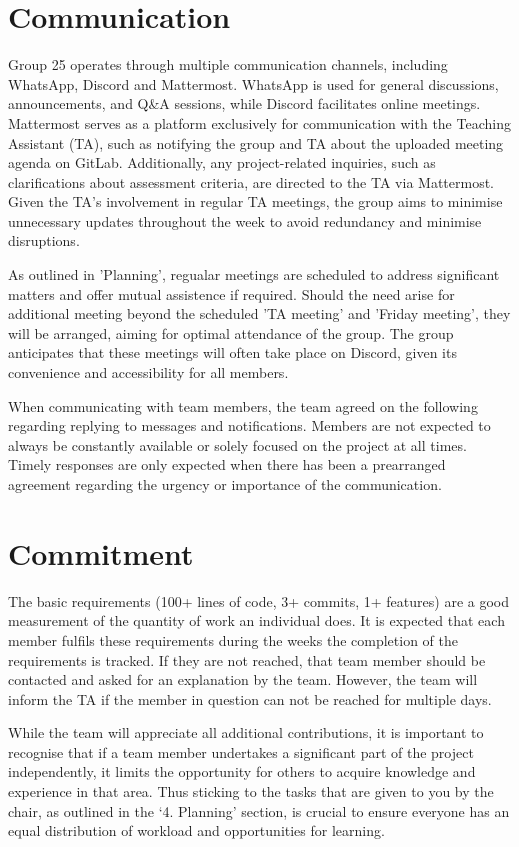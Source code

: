 \documentclass[sigconf,nonacm]{acmart}
\begin{document}
\section{Communication}
Group 25 operates through multiple communication channels, including WhatsApp, Discord and Mattermost. WhatsApp is used for general discussions, announcements, and Q\&A sessions, while Discord facilitates online meetings. Mattermost serves as a platform exclusively for communication with the Teaching Assistant (TA), such as notifying the group and TA about the uploaded meeting agenda on GitLab. Additionally, any project-related inquiries, such as clarifications about assessment criteria, are directed to the TA via Mattermost. Given the TA's involvement in regular TA meetings, the group aims to minimise unnecessary updates throughout the week to avoid redundancy and minimise disruptions.

As outlined in 'Planning', regualar meetings are scheduled to address significant matters and offer mutual assistence if required. Should the need arise for additional meeting beyond the scheduled 'TA meeting' and 'Friday meeting', they will be arranged, aiming for optimal attendance of the group. The group anticipates that these meetings will often take place on Discord, given its convenience and accessibility for all members.

When communicating with team members, the team agreed on the following regarding replying to messages and notifications. Members are not expected to always be constantly available or solely focused on the project at all times. Timely responses are only expected when there has been a prearranged agreement regarding the urgency or importance of the communication.


\section{Commitment}
The basic requirements (100+ lines of code, 3+ commits, 1+ features) are a good measurement of the quantity of work an individual does. It is expected that each member fulfils these requirements during the weeks the completion of the requirements is tracked. If they are not reached, that team member should be contacted and asked for an explanation by the team. However, the team will inform the TA if the member in question can not be reached for multiple days.

While the team will appreciate all additional contributions, it is important to recognise that if a team member undertakes a significant part of the project independently, it limits the opportunity for others to acquire knowledge and experience in that area. Thus sticking to the tasks that are given to you by the chair, as outlined in the ‘4. Planning’ section, is crucial to ensure everyone has an equal distribution of workload and opportunities for learning.
\end{document}
